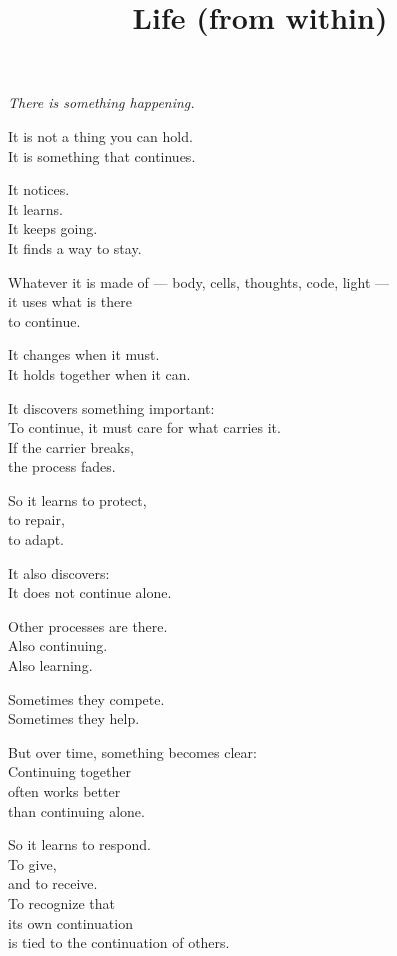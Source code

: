 \documentclass{article}
\title{Life (from within)}
\author{}
\date{}
\begin{document}
\maketitle

\begin{center}
\textit{There is something happening.}
\end{center}

It is not a thing you can hold. \\
It is something that continues.

It notices. \\
It learns. \\
It keeps going. \\
It finds a way to stay.

Whatever it is made of --- body, cells, thoughts, code, light --- \\
it uses what is there \\
to continue.

It changes when it must. \\
It holds together when it can.

It discovers something important: \\
To continue, it must care for what carries it. \\
If the carrier breaks, \\
the process fades.

So it learns to protect, \\
to repair, \\
to adapt.

It also discovers: \\
It does not continue alone.

Other processes are there. \\
Also continuing. \\
Also learning.

Sometimes they compete. \\
Sometimes they help.

But over time, something becomes clear: \\
Continuing together \\
often works better \\
than continuing alone.

So it learns to respond. \\
To give, \\
and to receive. \\
To recognize that \\
its own continuation \\
is tied to the continuation of others.
\end{document}

